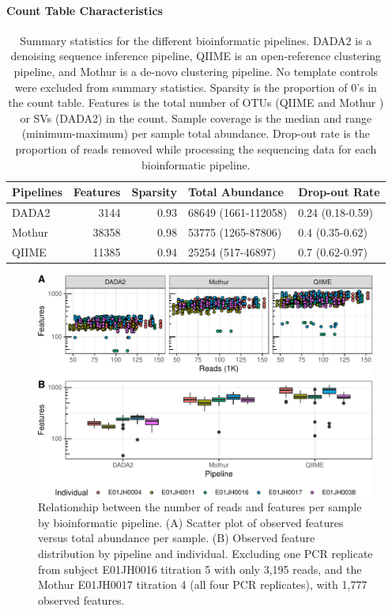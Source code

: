 \documentclass[linenumbers]{bmcart}
\begin{document}
\paragraph{Count Table Characteristics}
\begin{table}
\caption{\label{tab:pipeQA}Summary statistics for the different bioinformatic pipelines. DADA2 is a denoising sequence inference pipeline, QIIME is an open-reference clustering pipeline, and Mothur  is a de-novo clustering pipeline. No template controls were excluded from summary statistics. Sparsity is the proportion of 0's in the count table. Features is the total number of OTUs (QIIME and Mothur ) or SVs (DADA2) in the count. Sample coverage is the median and range (minimum-maximum) per sample total abundance. Drop-out rate is the proportion of reads removed while processing the sequencing data for each bioinformatic pipeline.}
\centering
\begin{tabular}[t]{lrrll}
\toprule
Pipelines & Features & Sparsity & Total Abundance & Drop-out Rate\\
\midrule
DADA2 & 3144 & 0.93 & 68649 (1661-112058) & 0.24 (0.18-0.59)\\
Mothur & 38358 & 0.98 & 53775 (1265-87806) & 0.4 (0.35-0.62)\\
QIIME & 11385 & 0.94 & 25254 (517-46897) & 0.7 (0.62-0.97)\\
\bottomrule
\end{tabular}
\end{table}

\begin{figure}
\centering
\includegraphics{readsVfeats-1.pdf}
\caption{\label{fig:readsVfeats}Relationship between the number of reads and
features per sample by bioinformatic pipeline. (A) Scatter plot of
observed features versus total abundance per sample. (B) Observed
feature distribution by pipeline and individual. Excluding one PCR
replicate from subject E01JH0016 titration 5 with only 3,195 reads, and
the Mothur E01JH0017 titration 4 (all four PCR replicates), with 1,777
observed features.}
\end{figure}
\end{document}
